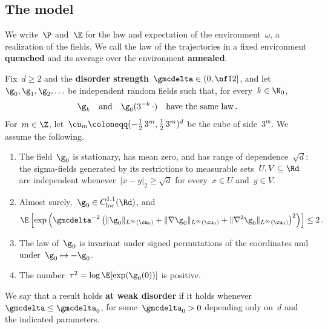 \documentclass[11pt]{amsart}
\begin{document}
\subsection{The model}
\label{ss.assumptions}

We write~$\P$ and~$\E$ for the law and expectation of the environment~$\omega$, a realization of the fields. We call the law of the trajectories in a fixed environment   \textbf{quenched} and its average over the environment \textbf{annealed}.

\smallskip

Fix~$d\geq2$ and the \textbf{disorder strength}~$\gmcdelta\in(0,\nf12]$, and let~$\g_0,\g_1,\g_2,\ldots$ be independent random fields such that, for every~$k\in\N_0$,
\begin{equation}
	\g_k
	\quad\text{and}\quad
	\g_0(3^{-k}\,\cdot)
	\quad\text{have the same law}\,.
	\label{e.same.law.shift}
\end{equation}
For~$m\in\Z$, let~$\cu_m\coloneqq(-\frac12\,3^m,\frac12\,3^m)^d$ be the cube of side~$3^m$. We assume the following.
\begin{enumerate}[label=(\textbf{g\arabic*})]
\setcounter{enumi}{0}

\item
\label{a.g1}
The field~$\g_0$ is stationary, has mean zero, and has range of dependence~$\sqrt d$: the sigma-fields generated by its restrictions to measurable sets~$U,V\subseteq\Rd$ are independent whenever~$|x-y|_2\geq\sqrt d$ for every~$x\in U$ and~$y\in V$.

\item
\label{a.g2}
Almost surely,~$\g_0\in C^{1,1}_{\mathrm{loc}}(\Rd)$, and
\begin{equation}
	\E\left[\exp\left(\gmcdelta^{-2}\left(\|\g_0\|_{L^\infty(\cu_0)}+\|\nabla\g_0\|_{L^\infty(\cu_0)}+\|\nabla^2\g_0\|_{L^\infty(\cu_0)}\right)^2\right)\right]\leq2\,.
	\label{e.coefficient.field.regularity}
\end{equation}
\item
\label{a.g3}
The law of~$\g_0$ is invariant under signed permutations of the coordinates and under~$\g_0\mapsto-\g_0$.

\item
\label{a.g4}
The number~$\tau^2=\log\E[\exp(\g_0(0))]$ is positive.
\end{enumerate}
We say that a result holds \textbf{at weak disorder} if it holds whenever~$\gmcdelta\leq\gmcdelta_0$, for some~$\gmcdelta_0>0$ depending only on~$d$ and the indicated parameters.
\end{document}
